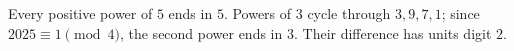 Every positive power of $5$ ends in $5$. Powers of $3$ cycle through $3,9,7,1$; since $2025\equiv1\pmod4$, the second power ends in $3$. Their difference has units digit $\boxed2$.

